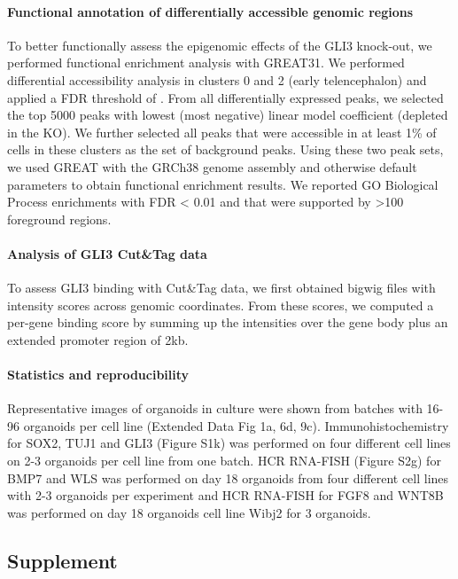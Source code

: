 \paragraph{Functional annotation of differentially accessible genomic regions}
To better functionally assess the epigenomic effects of the GLI3 knock-out, we performed functional enrichment analysis with GREAT31. We performed differential accessibility analysis in clusters 0 and 2 (early telencephalon) and applied a FDR threshold of . From all differentially expressed peaks, we selected the top 5000 peaks with lowest (most negative) linear model coefficient (depleted in the KO). We further selected all peaks that were accessible in at least 1\% of cells in these clusters as the set of background peaks. Using these two peak sets, we used GREAT with the GRCh38 genome assembly and otherwise default parameters to obtain functional enrichment results. We reported GO Biological Process enrichments with FDR < 0.01 and that were supported by >100 foreground regions.
 
\paragraph{Analysis of GLI3 Cut\&Tag data}
To assess GLI3 binding with Cut\&Tag data, we first obtained bigwig files with intensity scores across genomic coordinates. From these scores, we computed a per-gene binding score by summing up the intensities over the gene body plus an extended promoter region of 2kb.
 
\paragraph{Statistics and reproducibility}
Representative images of organoids in culture were shown from batches with 16-96 organoids per cell line (Extended Data Fig 1a, 6d, 9c). Immunohistochemistry for SOX2, TUJ1 and GLI3 (Figure S1k) was performed on four different cell lines on 2-3 organoids per cell line from one batch. HCR RNA-FISH (Figure S2g) for BMP7 and WLS was performed on day 18 organoids from four different cell lines with 2-3 organoids per experiment and HCR RNA-FISH for FGF8 and WNT8B was performed on day 18 organoids cell line Wibj2 for 3 organoids.

\clearpage

\subsection{Supplement}
\beginsupplement

